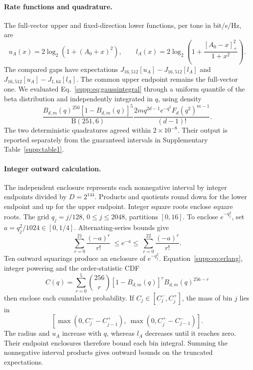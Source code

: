 \documentclass[10pt,letterpaper]{article}
\begin{document}
\paragraph{Rate functions and quadrature.}
The full-vector upper and fixed-direction lower functions, per tone in bit/s/Hz, are
\begin{equation}
 u_A(x)=2\log_2\!\left(1+(A_0+x)^2\right),\qquad
 l_A(x)=2\log_2\!\left(1+\frac{[A_0-x]_+^2}{1+x^2}\right).
 \label{supp:eq:gaussrates}
\end{equation}
The compared gaps have expectations \(J_{16,512}[u_A]-J_{16,512}[l_A]\) and
\(J_{16,512}[u_A]-J_{1,64}[l_A]\). The common upper endpoint remains the full-vector one. We evaluated Eq.~\eqref{supp:eq:gaussintegral} through a uniform quantile of the beta distribution and independently integrated in \(q\), using density
\begin{equation}
 \frac{B_{d,m}(q)^{250}[1-B_{d,m}(q)]^5}{\mathrm B(251,6)}
 \frac{2m q^{2d-1}e^{-q^2}F_d(q^2)^{m-1}}{(d-1)!}.
\end{equation}
The two deterministic quadratures agreed within \(2\times10^{-8}\). Their output is reported separately from the guaranteed intervals in Supplementary Table~\ref{supp:table1}.

\paragraph{Integer outward calculation.}
The independent enclosure represents each nonnegative interval by integer endpoints divided by \(D=2^{144}\). Products and quotients round down for the lower endpoint and up for the upper endpoint. Integer square roots enclose square roots. The grid \(q_j=j/128\), \(0\leq j\leq2048\), partitions \([0,16]\). To enclose \(e^{-q_j^2}\), set \(a=q_j^2/1024\in[0,1/4]\). Alternating-series bounds give
\begin{equation}
 \sum_{r=0}^{21}\frac{(-a)^r}{r!}
 \ \leq e^{-a}\leq\
 \sum_{r=0}^{22}\frac{(-a)^r}{r!}.
\end{equation}
Ten outward squarings produce an enclosure of \(e^{-q_j^2}\). Equation~\eqref{supp:eq:erlang}, integer powering and the order-statistic CDF
\begin{equation}
 C(q)=\sum_{r=0}^{5}\binom{256}{r}
       [1-B_{d,m}(q)]^r B_{d,m}(q)^{256-r}
 \label{supp:eq:ordercdf}
\end{equation}
then enclose each cumulative probability. If \(C_j\in[C_j^-,C_j^+]\), the mass of bin \(j\) lies in
\[
 \left[\max(0,C_j^--C_{j-1}^+),\
       \max(0,C_j^+-C_{j-1}^-)\right].
\]
The radius and \(u_A\) increase with \(q\), whereas \(l_A\) decreases until it reaches zero. Their endpoint enclosures therefore bound each bin integral. Summing the nonnegative interval products gives outward bounds on the truncated expectations.
\end{document}
